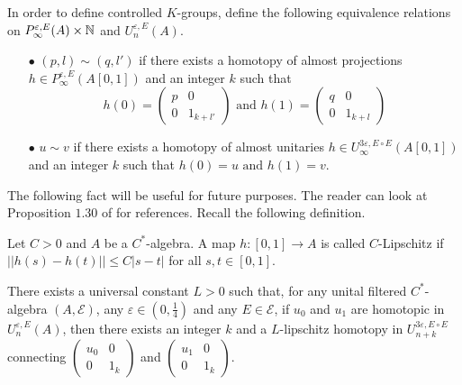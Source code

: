 In order to define controlled $K$-groups, define the following equivalence relations on $P^{\varepsilon, E}_\infty(A)\times \mathbb N$ and $U^{\varepsilon,E}_n(A)$.\\

\begin{itemize}

\item[$\bullet$] $(p,l) \sim (q,l')$ if there exists a homotopy of almost projections $h\in P^{\varepsilon, E}_\infty(A[0,1])$ and an integer $k$ such that 
\[h(0)=\begin{pmatrix} p & 0 \\ 0 & 1_{k+l'} \end{pmatrix} \text{ and }
h(1)=\begin{pmatrix} q & 0 \\ 0 & 1_{k+l} \end{pmatrix}\]
\item[$\bullet$] $u \sim v$ if there exists a homotopy of almost unitaries $h\in U^{3\varepsilon, E\circ E}_\infty(A[0,1])$ and an integer $k$ such that $h(0)= u \text{ and }h(1)=v$.\\
\end{itemize}

The following fact will be useful for future purposes. The reader can look at Proposition $1.30$ of \cite{OY3} for references. Recall the following definition.

\begin{definition}
Let $C>0$ and $A$ be a $C^*$-algebra. A map $h : [0,1]\rightarrow A $ is called $C$-Lipschitz if $||h(s)-h(t)||\leq C|s-t|$ for all $s,t\in [0,1]$.
\end{definition}

\begin{prop}\label{Lip}
There exists a universal constant $L>0$ such that, for any unital filtered $C^*$-algebra $(A,\mathcal E)$, any $\varepsilon\in(0,\frac{1}{4})$ and  any $E\in \mathcal E$, if $u_0$ and $u_1$ are homotopic in $U_n^{\varepsilon, E}(A)$, then there exists an integer $k$ and a $L$-lipschitz homotopy in $U_{n+k}^{3\varepsilon,E\circ E}$ connecting $\begin{pmatrix} u_0 & 0 \\ 0 & 1_k\end{pmatrix}$ and $\begin{pmatrix} u_1 & 0 \\ 0 & 1_k\end{pmatrix}$. 
\end{prop}

